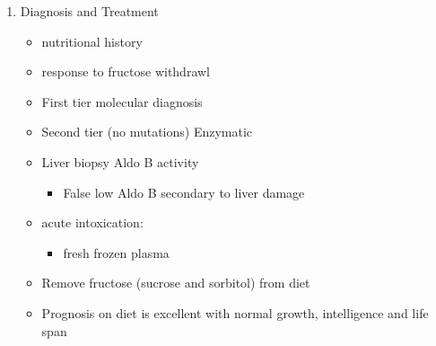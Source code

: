 \documentclass{scrartcl}
\begin{document}
\begin{enumerate}
\item Diagnosis and Treatment
\label{sec:org56b5a00}
\begin{itemize}
\item nutritional history
\item response to fructose withdrawl
\item First tier molecular diagnosis
\item Second tier (no mutations) Enzymatic
\item Liver biopsy Aldo B activity
\begin{itemize}
\item False low Aldo B secondary to liver damage
\end{itemize}

\item acute intoxication:
\begin{itemize}
\item fresh frozen plasma
\end{itemize}
\item Remove fructose (sucrose and sorbitol) from diet
\item Prognosis on diet is excellent with normal growth,
intelligence and life span
\end{itemize}
\end{enumerate}
\end{document}

